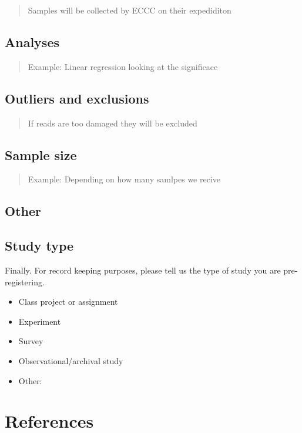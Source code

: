 \documentclass[]{article}
\providecommand{\tightlist}{%
\setlength{\itemsep}{0pt}\setlength{\parskip}{0pt}}
\begin{document}
\begin{quote}
Samples will be collected by ECCC on their expediditon
\end{quote}

\hypertarget{analyses}{%
\subsection{Analyses}\label{analyses}}

\begin{quote}
Example: Linear regression looking at the significace
\end{quote}

\hypertarget{outliers-and-exclusions}{%
\subsection{Outliers and exclusions}\label{outliers-and-exclusions}}

\begin{quote}
If reads are too damaged they will be excluded
\end{quote}

\hypertarget{sample-size}{%
\subsection{Sample size}\label{sample-size}}

\begin{quote}
Example: Depending on how many samlpes we recive
\end{quote}

\hypertarget{other}{%
\subsection{Other}\label{other}}

\hypertarget{study-type}{%
\subsection{Study type}\label{study-type}}

Finally. For record keeping purposes, please tell us the type of study
you are pre-registering.

\begin{itemize}
\tightlist
\item
  Class project or assignment
\item
  Experiment
\item
  Survey
\item
  Observational/archival study
\item
  Other:
\end{itemize}

\hypertarget{references}{%
\section{References}\label{references}}

\hypertarget{section}{%
\subsection{}\label{section}}

\vspace{-2pc}
\setlength{\parindent}{-0.5in}
\setlength{\leftskip}{-1in}
\setlength{\parskip}{8pt}

\noindent
\end{document}

